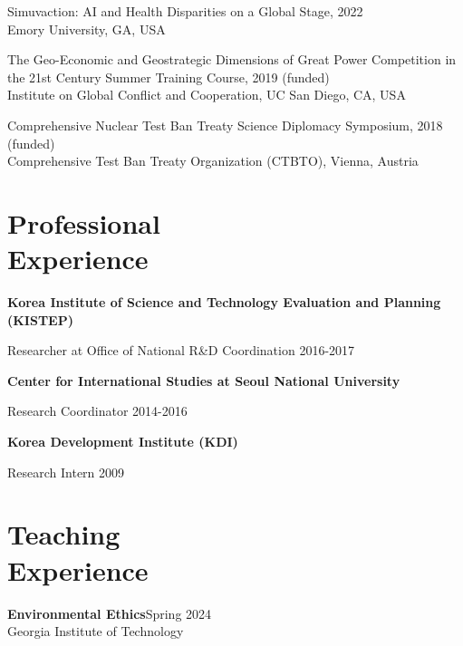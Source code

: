 \documentclass[margin,line, 10pt]{res}
\begin{document}
\begin{resume}
Simuvaction: AI and Health Disparities on a Global Stage, 2022\\
Emory University, GA, USA

The Geo-Economic and Geostrategic Dimensions of Great Power Competition in the 21st 
Century Summer Training Course, 2019 (funded)\\
Institute on Global Conflict and Cooperation, UC San Diego, CA, USA

Comprehensive Nuclear Test Ban Treaty Science Diplomacy Symposium, 2018 (funded)\\
Comprehensive Test Ban Treaty Organization (CTBTO), Vienna, Austria\\



\section{\sc Professional\\ Experience}
\textbf{Korea Institute of Science and Technology Evaluation and Planning (KISTEP)}

\vspace{-0.4cm}
Researcher at Office of National R\&D Coordination \hfill {2016-2017 }

\textbf{Center for International Studies at Seoul National University}

\vspace{-0.4cm}
Research Coordinator \hfill {2014-2016}

{\bf Korea Development Institute (KDI)}

\vspace{-0.4cm}
Research Intern \hfill {2009}\\

\section{\sc Teaching\\ Experience}
{\bf Environmental Ethics}\hfill{Spring 2024}\\
Georgia Institute of Technology\\
\vspace{-0.4cm}


\end{resume}
\end{document}
